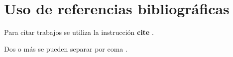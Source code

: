 \section{Uso de referencias bibliográficas}
Para citar trabajos se utiliza la instrucción \textbf{cite} \cite{Bonaparte75}.

Dos o más se pueden separar por coma \cite{Brown, Fulanito1999}.